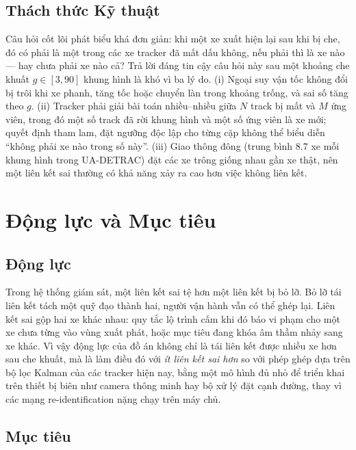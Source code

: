 \subsection{Thách thức Kỹ thuật}
\label{sec:bg_challenges}

Câu hỏi cốt lõi phát biểu khá đơn giản: khi một xe xuất hiện lại sau khi bị che, đó có phải là một trong các xe tracker đã mất dấu không, nếu phải thì là xe nào --- hay chưa phải xe nào cả? Trả lời đáng tin cậy câu hỏi này sau một khoảng che khuất $g \in [3, 90]$ khung hình là khó vì ba lý do. (i) Ngoại suy vận tốc không đổi bị trôi khi xe phanh, tăng tốc hoặc chuyển làn trong khoảng trống, và sai số tăng theo $g$. (ii) Tracker phải giải bài toán nhiều--nhiều giữa $N$ track bị mất và $M$ ứng viên, trong đó một số track đã rời khung hình và một số ứng viên là xe mới; quyết định tham lam, đặt ngưỡng độc lập cho từng cặp không thể biểu diễn ``không phải xe nào trong số này''. (iii) Giao thông đông (trung bình $8.7$ xe mỗi khung hình trong UA-DETRAC) đặt các xe trông giống nhau gần xe thật, nên một liên kết sai thường có khả năng xảy ra cao hơn việc không liên kết.

\section{Động lực và Mục tiêu}
\label{sec:motivation_objective}

\subsection{Động lực}
\label{sec:motivation}

Trong hệ thống giám sát, một liên kết sai tệ hơn một liên kết bị bỏ lỡ. Bỏ lỡ tái liên kết tách một quỹ đạo thành hai, người vận hành vẫn có thể ghép lại. Liên kết sai gộp hai xe khác nhau: quy tắc lộ trình cấm khi đó báo vi phạm cho một xe chưa từng vào vùng xuất phát, hoặc mục tiêu đang khóa âm thầm nhảy sang xe khác. Vì vậy động lực của đồ án không chỉ là tái liên kết được nhiều xe hơn sau che khuất, mà là làm điều đó với \emph{ít liên kết sai hơn} so với phép ghép dựa trên bộ lọc Kalman của các tracker hiện nay, bằng một mô hình đủ nhỏ để triển khai trên thiết bị biên như camera thông minh hay bộ xử lý đặt cạnh đường, thay vì các mạng re-identification nặng chạy trên máy chủ.

\subsection{Mục tiêu}
\label{sec:objectives}

